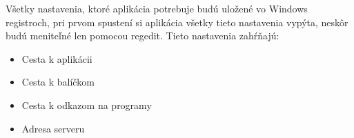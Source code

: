 Všetky nastavenia, ktoré aplikácia potrebuje budú uložené vo Windows registroch, pri prvom spustení si aplikácia všetky tieto nastavenia vypýta, neskôr budú meniteľné len pomocou regedit. Tieto nastavenia zahŕňajú:

\begin{itemize}
\item Cesta k aplikácii
\item Cesta k balíčkom
\item Cesta k odkazom na programy
\item Adresa serveru
\end{itemize}

